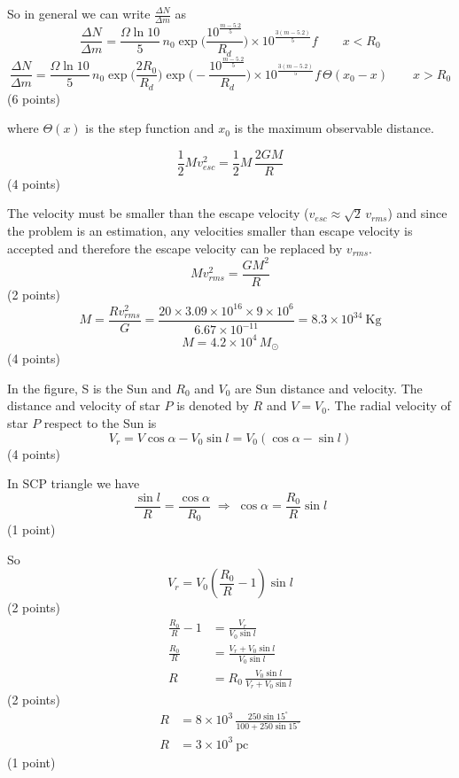 \begin{description}
  So in general we can write $\frac{\Delta N}{\Delta m}$ as
  \[
    \frac{\Delta N}{\Delta m}
      = \frac{\Omega \ln 10}{5}\,n_0
        \exp\Big(\frac{10^{\frac{m-5.2}{5}}}{R_d}\Big)
        \times 10^{\frac{3(m-5.2)}{5}} f
    \qquad x < R_0
  \]
  \[
    \frac{\Delta N}{\Delta m}
      = \frac{\Omega \ln 10}{5}\,n_0
        \exp\Big(\frac{2R_0}{R_d}\Big)
        \exp\Big(-\frac{10^{\frac{m-5.2}{5}}}{R_d}\Big)
        \times 10^{\frac{3(m-5.2)}{5}} f\,\Theta(x_0 - x)
    \qquad x > R_0
  \]
  \hfill(6 points)

  where $\Theta(x)$ is the step function and $x_0$ is the maximum observable
  distance.
\end{description}

\[
  \frac{1}{2}Mv_{esc}^2 = \frac{1}{2}M\,\frac{2GM}{R}
\]
\hfill(4 points)

The velocity must be smaller than the escape velocity
($v_{esc} \approx \sqrt{2}\,v_{rms}$) and since the problem is an estimation,
any velocities smaller than escape velocity is accepted and therefore the
escape velocity can be replaced by $v_{rms}$.
\[
  Mv_{rms}^2 = \frac{GM^2}{R}
\]
\hfill(2 points)
\[
  M = \frac{Rv_{rms}^2}{G}
    = \frac{20 \times 3.09\times10^{16} \times 9\times10^{6}}{6.67\times10^{-11}}
    = 8.3\times10^{34}\ \mathrm{Kg}
\]
\[
  M = 4.2\times10^{4}\,M_\odot
\]
\hfill(4 points)

In the figure, S is the Sun and $R_0$ and $V_0$ are Sun distance and velocity.
The distance and velocity of star $P$ is denoted by $R$ and $V = V_0$. The
radial velocity of star $P$ respect to the Sun is
\[
  V_r = V\cos\alpha - V_0\sin l = V_0(\cos\alpha - \sin l)
\]
\hfill(4 points)

In SCP triangle we have
\[
  \frac{\sin l}{R} = \frac{\cos\alpha}{R_0}
  \;\Rightarrow\; \cos\alpha = \frac{R_0}{R}\sin l
\]
\hfill(1 point)

So
\[
  V_r = V_0\left(\frac{R_0}{R} - 1\right)\sin l
\]
\hfill(2 points)
\begin{align*}
  \frac{R_0}{R} - 1 &= \frac{V_r}{V_0\sin l}\\
  \frac{R_0}{R} &= \frac{V_r + V_0\sin l}{V_0\sin l}\\
  R &= R_0\,\frac{V_0\sin l}{V_r + V_0\sin l}
\end{align*}
\hfill(2 points)
\begin{align*}
  R &= 8\times10^{3}\,\frac{250\sin 15^\circ}{100 + 250\sin 15^\circ}\\
  R &= 3\times10^{3}\ \mathrm{pc}
\end{align*}
\hfill(1 point)

